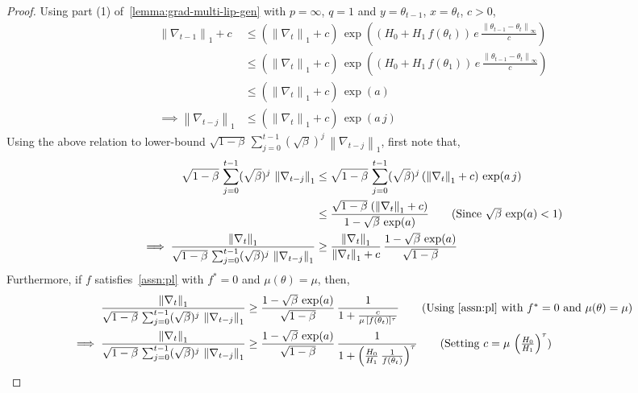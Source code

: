 \documentclass{article}
\newcommand{\norm}[1]{\left\|#1 \right\|}
\newcommand{\tht}{\theta_t}
\begin{document}
\begin{proof}
Using part (1) of~\cref{lemma:grad-multi-lip-gen} with $p = \infty$, $q = 1$ and $y = \theta_{t-1}$, $x = \tht$, $c > 0$, 
\begin{align*}
\norm{\nabla_{t-1}}_1 + c & \leq (\norm{\nabla_{t}}_1 + c) \, \exp\left((H_0 + H_1 \, f(\tht)) \, e \,  \frac{\norm{\theta_{t-1} - \tht}_\infty}{c} \right) \\
& \leq (\norm{\nabla_{t}}_1 + c) \, \exp\left((H_0 + H_1 \, f(\theta_1)) \, e \,  \frac{\norm{\theta_{t-1} - \tht}_\infty}{c} \right) \tag{Using assumption (ii)} \\
& \leq (\norm{\nabla_{t}}_1 + c) \, \exp(a) \tag{Using assumption (i)} \\
\implies \norm{\nabla_{t-j}}_1 & \leq (\norm{\nabla_{t}}_1 + c) \, \exp(a \, j) \tag{Recursing and since $c > 0$}
\end{align*}
Using the above relation to lower-bound $\sqrt{1 - \beta} \, \sum_{j = 0}^{t-1} (\sqrt{\beta})^{j} \, \norm{\nabla_{t-j}}_1$, first note that, 
\begin{align*}
\sqrt{1 - \beta} \, \sum_{j = 0}^{t-1} (\sqrt{\beta})^{j} \, \norm{\nabla_{t-j}}_1 & \leq \sqrt{1 - \beta} \, \sum_{j = 0}^{t-1} (\sqrt{\beta})^j \, (\norm{\nabla_{t}}_1 + c) \, \exp(a \, j) \\
& \leq \frac{\sqrt{1 - \beta} \; (\norm{\nabla_{t}}_1 + c)}{1 - \sqrt{\beta} \, \exp(a)} \tag{Since $\sqrt{\beta} \, \exp(a) < 1$} \\
\implies \frac{\norm{\nabla_t}_1}{\sqrt{1 - \beta} \, \sum_{j = 0}^{t-1} (\sqrt{\beta})^{j} \, \norm{\nabla_{t-j}}_1} & \geq \frac{\norm{\nabla_t}_1}{\norm{\nabla_t}_1 + c} \, \frac{1 - \sqrt{\beta} \, \exp(a)}{\sqrt{1 - \beta}} 
\end{align*}
Furthermore, if $f$ satisfies~\cref{assn:pl} with $f^* = 0$ and $\mu(\theta) = \mu$, then, 
\begin{align*}
\frac{\norm{\nabla_t}_1}{\sqrt{1 - \beta} \, \sum_{j = 0}^{t-1} (\sqrt{\beta})^{j} \, \norm{\nabla_{t-j}}_1}  & \geq \frac{1 - \sqrt{\beta} \, \exp(a)}{\sqrt{1 - \beta}} \, \frac{1}{1 + \frac{c}{\mu \, [f(\tht)]^{\tau}}} \tag{Using~\cref{assn:pl} with $f^* = 0$ and $\mu(\theta) = \mu$} \\
\implies \frac{\norm{\nabla_t}_1}{\sqrt{1 - \beta} \, \sum_{j = 0}^{t-1} (\sqrt{\beta})^{j} \, \norm{\nabla_{t-j}}_1} & \geq \frac{1 - \sqrt{\beta} \, \exp(a)}{\sqrt{1 - \beta}} \, \frac{1}{1 + \left(\frac{H_0}{H_1} \, \frac{1}{f(\tht)}\right)^{\tau}} \tag{Setting $c = \mu \, \left(\frac{H_0}{H_1}\right)^{\tau}$}
\end{align*}
\end{proof}
\end{document}
